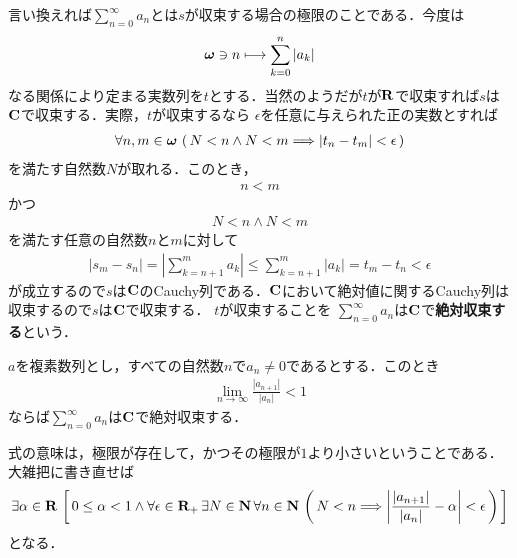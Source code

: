 	言い換えれば$\sum_{n=0}^\infty a_n$とは$s$が収束する場合の極限のことである．今度は
	\begin{align}
		{\boldsymbol \omega} \ni n \longmapsto \sum_{k=0}^n |a_k|
	\end{align}
	なる関係により定まる実数列を$t$とする．当然のようだが$t$が$\mathbf{R}$で収束すれば$s$は$\mathbf{C}$で収束する．実際，$t$が収束するなら
	$\epsilon$を任意に与えられた正の実数とすれば
	\begin{align}
		\forall n,m \in {\boldsymbol \omega}\, \left(\, N < n \wedge N < m \Longrightarrow 
		|t_n - t_m| < \epsilon\, \right)
	\end{align}
	を満たす自然数$N$が取れる．このとき，
	\begin{align}
		n < m
	\end{align}
	かつ
	\begin{align}
		N < n \wedge N < m
	\end{align}
	を満たす任意の自然数$n$と$m$に対して
	\begin{align}
		|s_m - s_n| = \left|\sum_{k=n+1}^m a_k\right| \leq \sum_{k=n+1}^m |a_k| = t_m - t_n < \epsilon
	\end{align}
	が成立するので$s$は$\mathbf{C}$のCauchy列である．$\mathbf{C}$において絶対値に関するCauchy列は収束するので$s$は$\mathbf{C}$で収束する．
	$t$が収束することを
	$\sum_{n=0}^\infty a_n$は$\mathbf{C}$で{\bf 絶対収束する}という．
	
	\begin{screen}
		\begin{thm}[d'Alembertの収束判定法]
			$a$を複素数列とし，すべての自然数$n$で$a_n \neq 0$であるとする．このとき
			\begin{align}
				\lim_{n \to \infty} \frac{|a_{n+1}|}{|a_n|} < 1
			\end{align}
			ならば$\sum_{n=0}^\infty a_n$は$\mathbf{C}$で絶対収束する．
		\end{thm}
	\end{screen}
	
	式の意味は，極限が存在して，かつその極限が$1$より小さいということである．大雑把に書き直せば
	\begin{align}
		\exists \alpha \in \mathbf{R}\, \left[\, 
		0 \leq \alpha < 1 \wedge \forall \epsilon \in \mathbf{R}_+\, \exists N \in \mathbf{N}\, \forall n \in \mathbf{N}\,
		\left(\, N < n \Longrightarrow \left|\frac{|a_{n+1}|}{|a_n|} - \alpha\right| < \epsilon\, \right)\, \right]
	\end{align}
	となる．
	
